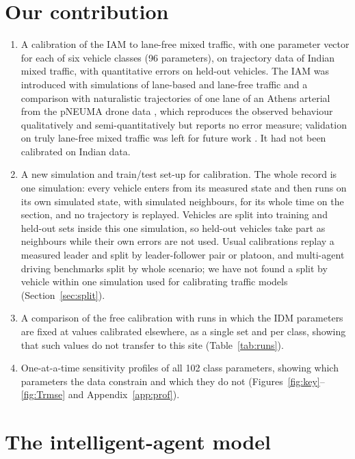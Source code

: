 \documentclass[11pt]{article}
\begin{document}
\section{Our contribution}
\label{sec:contrib}
\begin{enumerate}\setlength{\itemsep}{2pt}
\item A calibration of the IAM to lane-free mixed traffic, with one parameter
vector for each of six vehicle classes (96 parameters), on trajectory data of
Indian mixed traffic, with quantitative errors on held-out vehicles. The IAM was
introduced with simulations of lane-based and lane-free traffic and a
comparison with naturalistic trajectories of one lane of an Athens arterial
from the pNEUMA drone data \cite{pneuma20}, which reproduces the observed
behaviour qualitatively and semi-quantitatively but reports no error measure;
validation on truly lane-free mixed traffic was left for future work
\cite{iam}. It had not been calibrated on Indian data.
\item A new simulation and train/test set-up for calibration. The whole record
is one simulation: every vehicle enters from its measured state and then runs on
its own simulated state, with simulated neighbours, for its whole time on the
section, and no trajectory is replayed. Vehicles are split into training and
held-out sets inside this one simulation, so held-out vehicles take part as
neighbours while their own errors are not used. Usual calibrations replay a
measured leader and split by leader-follower pair or platoon, and
multi-agent driving benchmarks split by whole scenario; we have not found a split
by vehicle within one simulation used for calibrating traffic models
(Section~\ref{sec:split}).

\item A comparison of the free calibration with runs in which the IDM
parameters are fixed at values calibrated elsewhere, as a single set and per
class, showing that such values do not transfer to this site
(Table~\ref{tab:runs}).
\item One-at-a-time sensitivity profiles of all 102 class parameters, showing
which parameters the data constrain and which they do not
(Figures~\ref{fig:key}--\ref{fig:Trmse} and Appendix~\ref{app:prof}).
\end{enumerate}

\section{The intelligent-agent model}
\label{sec:model}
\end{document}
